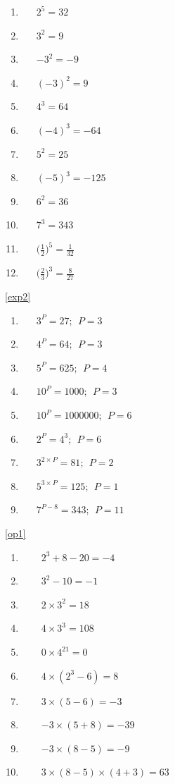 \documentclass[a4paper,12pt]{article}
\begin{document}
	\begin{multicols}{3}
	\begin{enumerate}[label=\footnotesize \roman*)]
		\item~~~$\displaystyle 2^5=32$
		\item~~~$\displaystyle 3^2=9$
		\item~~~$\displaystyle -3^2=-9$
		\item~~~$\displaystyle (-3)^2=9$
		\item~~~$\displaystyle 4^3=64$
		\item~~~$\displaystyle (-4)^3=-64$
		\item~~~$\displaystyle 5^2=25$
		\item~~~$\displaystyle (-5)^3=-125$
		\item~~~$\displaystyle 6^2=36$
		\item~~~$\displaystyle 7^3=343$
		\item~~~$\displaystyle \Big(\frac{1}{2}\Big)^{5}=\frac{1}{32}$
		\item~~~$\displaystyle \Big(\frac{2}{3}\Big)^{3}=\frac{8}{27}$
	\end{enumerate}
\end{multicols}
\ref{exp2}
\begin{multicols}{3}
	\begin{enumerate}[label=\footnotesize \roman*)]
		\item~~~$\displaystyle 3^P=27;~~P=3$
		\item~~~$\displaystyle 4^P=64;~~P=3$
		\item~~~$\displaystyle 5^P=625;~~P=4$
		\item~~~$\displaystyle 10^P=1000;~~P=3$
		\item~~~$\displaystyle 10^P=1000000;~~P=6$
		\item~~~$\displaystyle 2^P=4^3;~~P=6$
		\item~~~$\displaystyle 3^{2 \times P}=81;~~P=2$
		\item~~~$\displaystyle 5^{3 \times P}=125;~~P=1$
		\item~~~$\displaystyle 7^{P-8}=343;~~P=11$
	\end{enumerate}
\end{multicols}
\ref{op1}
	\begin{multicols}{2}
	\begin{enumerate}[label=\footnotesize \roman*)]
		\item ~~~~$2^3+8-20=-4$
		\item ~~~~$3^{2}-10=-1$
		\item ~~~~$2\times3^2=18$
		\item ~~~~$4\times3^3=108$
		\item ~~~~$0\times4^{21}=0$
		\item ~~~~$4\times(2^3-6)=8$
		\item ~~~~$3\times(5-6)=-3$
		\item ~~~~$-3\times(5+8)=-39$
		\item ~~~~$-3\times(8-5)=-9$
		\item ~~~~$3\times(8-5)\times(4+3)=63$
	\end{enumerate}
\end{multicols}
\end{document}

